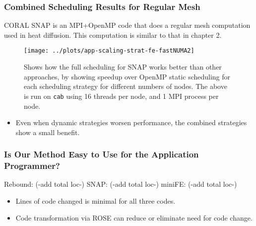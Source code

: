 \begin{frame}[label=combinedregmesh]
\frametitle{Combined Scheduling Results for Regular Mesh}
{\tiny CORAL SNAP is an MPI+OpenMP code that does a regular mesh
  computation used in heat diffusion. This computation is similar to
  that in chapter 2.}
\begin{figure}
\texttt{[image: ../plots/app-scaling-strat-fe-fastNUMA2]}\\
\caption{\tiny Shows how the full scheduling for SNAP 
works better than other approaches, by showing speedup over OpenMP
static scheduling for each scheduling strategy for different numbers
of nodes. The above is run on \texttt{cab} using 16 threads per node, 
and 1 MPI process per node.}
\end{figure}

\begin{itemize}
\tiny \item \tiny Even when dynamic strategies worsen performance, the
combined strategies show a small benefit. 
\end{itemize}
\end{frame}


\begin{frame}[label=programmerEffort]
\frametitle{Is Our Method Easy to Use for the Application Programmer?}
{\tiny Rebound: (-add total loc-) SNAP: (-add total loc-)  miniFE: (-add total loc-) \\}


\begin{itemize}
\tiny \item \tiny Lines of code changed is minimal for all three codes. 
\item \tiny Code transformation via ROSE \comments{(and changes to
  GOMP)} can reduce or eliminate need for code change.
\end{itemize}
\end{frame}

